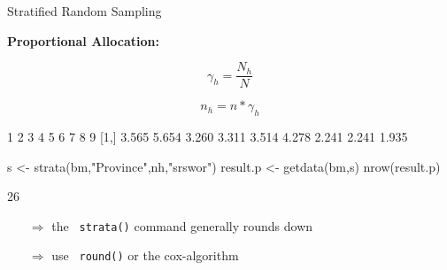 \documentclass[11pt,german,hideothersubsections]{beamer}
\newcommand{\R}[1]{{\tt \color{blue}  #1}}
\begin{document}
\begin{frame}[fragile]{Stratified Random Sampling}
\vspace{-.35cm}
\footnotesize{
\begin{center}
\textbf{Proportional Allocation:}
\end{center}
\begin{equation*}
\gamma_{h}=\frac{N_h}{N}
\end{equation*}

\begin{equation*}
n_h=n*\gamma_{h}
\end{equation*}

\begin{Schunk}
\begin{Soutput}
           1     2     3     4     5     6     7     8     9
  [1,] 3.565 5.654 3.260 3.311 3.514 4.278 2.241 2.241 1.935
\end{Soutput}
\begin{Sinput}
 s <- strata(bm,"Province",nh,"srswor")
 result.p <- getdata(bm,s)
 nrow(result.p)
\end{Sinput}
\begin{Soutput}
[1] 26
\end{Soutput}
\end{Schunk}
\begin{itemize}
\item[$\Rightarrow$] the \R{strata()} command generally rounds down
\item[$\Rightarrow$] use \R{round()} or the cox-algorithm
\end{itemize}
}
\end{frame}
\end{document}
